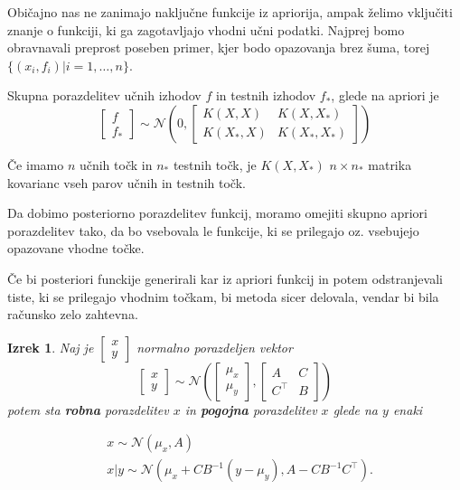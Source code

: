 \documentclass[12pt,a4paper]{amsart}
\theoremstyle{definition} %
\theoremstyle{plain} %
\newtheorem{izrek}[definicija]{Izrek}
\begin{document}
Običajno nas ne zanimajo naključne funkcije iz apriorija, ampak želimo vključiti znanje o funkciji, ki ga zagotavljajo vhodni učni podatki.
Najprej bomo obravnavali preprost poseben primer, kjer bodo opazovanja brez šuma, 
torej $ \{ (x_{i}, f_{i}) | i = 1, \ldots , n\}$.

Skupna porazdelitev učnih izhodov $f$ in testnih izhodov $f_{*}$, glede na apriori je
\begin{equation}
\begin{bmatrix}
f\\ 
f_{*}
\end{bmatrix}
\sim \mathcal{N} ( 0, 
\begin{bmatrix}
K(X,X) & K(X,X_{*}) \\ 
K(X_{*},X) & K(X_{*},X_{*})
\end{bmatrix})
\end{equation}

Če imamo $n$ učnih točk in $n_{*}$ testnih točk, je $K(X, X_{*})$ $ n \times n_{*}$ matrika
kovarianc vseh parov učnih in testnih točk. 

Da dobimo posteriorno porazdelitev funkcij, moramo omejiti skupno apriori porazdelitev tako, 
da bo vsebovala le funkcije, ki se prilegajo oz. vsebujejo opazovane vhodne točke. 

\opomba Če bi posteriori funckije generirali kar iz apriori funkcij in potem odstranjevali tiste, ki se prilegajo vhodnim točkam, 
bi metoda sicer delovala, vendar bi bila računsko zelo zahtevna. 

\begin{izrek}\label{izrek2} Naj je $ \begin{bmatrix}
x\\ 
y
\end{bmatrix} $ normalno porazdeljen vektor
\begin{equation}
 \begin{bmatrix}
x\\ 
y
\end{bmatrix} \sim \mathcal{N}(\begin{bmatrix}
\mu_{x}\\ 
\mu_{y}
\end{bmatrix}, \begin{bmatrix}
A & C\\ 
C^\top & B
\end{bmatrix}) 
\end{equation}
potem sta \textbf{robna} porazdelitev $x$ in \textbf{pogojna} porazdelitev $x$ glede na $y$ enaki

\begin{equation}
\begin{split}
& x \sim \mathcal{N} (\mu_{x}, A) \\
& x|y \sim \mathcal{N} (\mu_{x} + CB^{-1}(y-\mu_{y}), A-CB^{-1}C^\top).
\end{split}
\end{equation}
\end{izrek}
\end{document}
